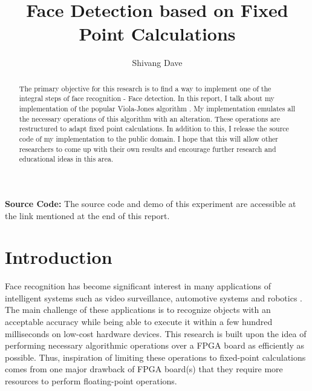 \documentclass[12pt]{elsarticle}
\begin{document}
\begin{frontmatter}
\title{Face Detection based on Fixed Point Calculations}
\author{Shivang Dave}
\address{University of Houston - Clear Lake}
\begin{abstract}
The primary objective for this research is to find a way to implement one of the integral steps of face recognition - Face detection. In this report, I talk about my implementation of the popular Viola-Jones algorithm \cite{Three}. My implementation emulates all the necessary operations of this algorithm with an alteration. These operations are restructured to adapt fixed point calculations. In addition to this, I release the source code of my implementation to the public domain. I hope that this will allow other researchers to come up with their own results and encourage further research and educational ideas in this area.
\end{abstract}
\end{frontmatter}
\textbf{Source Code:} The source code and demo of this experiment are accessible at the link mentioned at the end of this report\cite{Five}.
\section{Introduction}
\label{S:1}
Face recognition has become significant interest in many applications of intelligent systems such as video surveillance, automotive systems and robotics \cite{Two}. The main challenge of these applications is to recognize objects with an acceptable accuracy while being able to execute it within a few hundred milliseconds on low-cost hardware devices. This research is built upon the idea of performing necessary algorithmic operations over a FPGA board as efficiently as possible. Thus, inspiration of limiting these operations to fixed-point calculations comes from one major drawback of FPGA board(s) that they require more resources to perform floating-point operations. 
\end{document}
